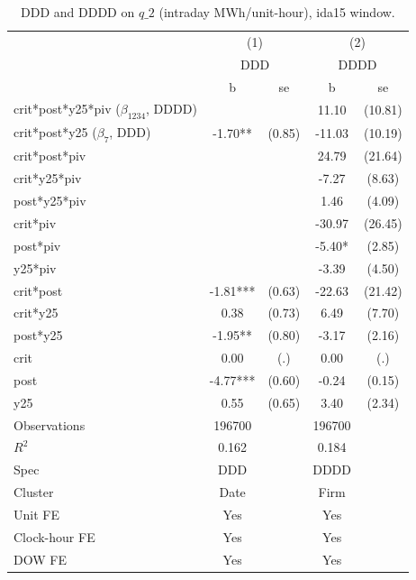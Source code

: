 \begin{table}[htbp]\centering
\def\sym#1{\ifmmode^{#1}\else\(^{#1}\)\fi}
\caption{DDD and DDDD on $q\_2$ (intraday MWh/unit-hour), ida15 window.}\label{tab:reform_ddd_firm_q2_ida15}
\begin{tabular}{l*{2}{cc}}
\toprule
                    &\multicolumn{2}{c}{(1)}     &\multicolumn{2}{c}{(2)}     \\
                    &\multicolumn{2}{c}{DDD}     &\multicolumn{2}{c}{DDDD}    \\
                    &           b   &          se&           b   &          se\\
\midrule
crit*post*y25*piv ($\beta_{1234}$, DDDD)&               &            &       11.10   &     (10.81)\\
crit*post*y25 ($\beta_7$, DDD)&       -1.70** &      (0.85)&      -11.03   &     (10.19)\\
crit*post*piv       &               &            &       24.79   &     (21.64)\\
crit*y25*piv        &               &            &       -7.27   &      (8.63)\\
post*y25*piv        &               &            &        1.46   &      (4.09)\\
crit*piv            &               &            &      -30.97   &     (26.45)\\
post*piv            &               &            &       -5.40*  &      (2.85)\\
y25*piv             &               &            &       -3.39   &      (4.50)\\
crit*post           &       -1.81***&      (0.63)&      -22.63   &     (21.42)\\
crit*y25            &        0.38   &      (0.73)&        6.49   &      (7.70)\\
post*y25            &       -1.95** &      (0.80)&       -3.17   &      (2.16)\\
crit                &        0.00   &         (.)&        0.00   &         (.)\\
post                &       -4.77***&      (0.60)&       -0.24   &      (0.15)\\
y25                 &        0.55   &      (0.65)&        3.40   &      (2.34)\\
\midrule
Observations        &      196700   &            &      196700   &            \\
$R^2$               &       0.162   &            &       0.184   &            \\
Spec                &         DDD   &            &        DDDD   &            \\
Cluster             &        Date   &            &        Firm   &            \\
Unit FE             &         Yes   &            &         Yes   &            \\
Clock-hour FE       &         Yes   &            &         Yes   &            \\
DOW FE              &         Yes   &            &         Yes   &            \\
\bottomrule
\end{tabular}
\end{table}
